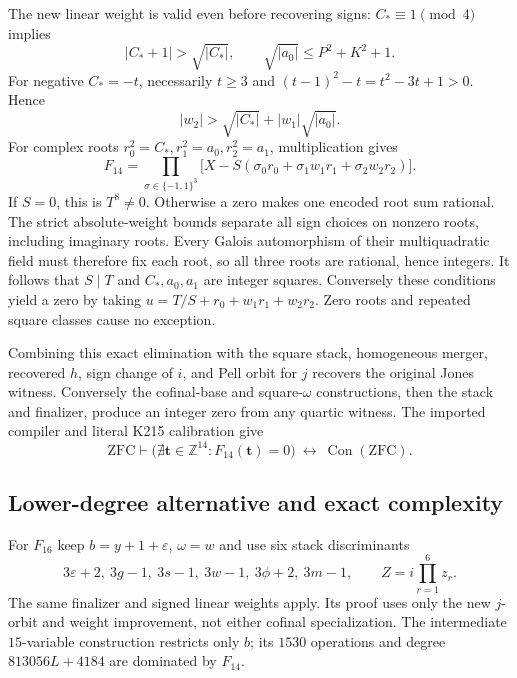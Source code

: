 The new linear weight is valid even before recovering signs:
$C_*\equiv1\pmod4$ implies
\[
 |C_*+1|>\sqrt{|C_*|},\qquad
 \sqrt{|a_0|}\le P^2+K^2+1.
\]
For negative $C_*=-t$, necessarily $t\ge3$ and
$(t-1)^2-t=t^2-3t+1>0$. Hence
\[
 |w_2|>\sqrt{|C_*|}+|w_1|\sqrt{|a_0|}.
\]
For complex roots $r_0^2=C_*,r_1^2=a_0,r_2^2=a_1$, multiplication gives
\[
 F_{14}=\prod_{\sigma\in\{-1,1\}^3}
 \bigl[X-S(\sigma_0r_0+\sigma_1w_1r_1+\sigma_2w_2r_2)\bigr].
\]
If $S=0$, this is $T^8\ne0$. Otherwise a zero makes one encoded
root sum rational. The strict absolute-weight bounds separate all
sign choices on nonzero roots, including imaginary roots. Every
Galois automorphism of their multiquadratic field must therefore fix
each root, so all three roots are rational, hence integers. It follows
that $S\mid T$ and $C_*,a_0,a_1$ are integer squares. Conversely these
conditions yield a zero by taking
$u=T/S+r_0+w_1r_1+w_2r_2$. Zero roots and repeated square classes
cause no exception.

Combining this exact elimination with the square stack, homogeneous
merger, recovered $h$, sign change of $i$, and Pell orbit for $j$
recovers the original Jones witness. Conversely the cofinal-base and
square-$\omega$ constructions, then the stack and finalizer, produce
an integer zero from any quartic witness. The imported compiler and
literal K215 calibration give
\[
 \mathrm{ZFC}\vdash
 \bigl(\nexists\mathbf t\in\mathbb Z^{14}:F_{14}(\mathbf t)=0\bigr)
 \ \longleftrightarrow\ \operatorname{Con}(\mathrm{ZFC}).
\]

\subsection{Lower-degree alternative and exact complexity}
For $F_{16}$ keep $b=y+1+\varepsilon$, $\omega=w$ and use six
stack discriminants
\[
 3\varepsilon+2,\ 3g-1,\ 3s-1,\ 3w-1,\ 3\phi+2,\ 3m-1,
 \qquad Z=i\prod_{r=1}^6z_r.
\]
The same finalizer and signed linear weights apply. Its proof uses
only the new $j$-orbit and weight improvement, not either cofinal
specialization. The intermediate $15$-variable construction restricts
only $b$; its $1530$ operations and degree $813056L+4184$ are dominated
by $F_{14}$.

